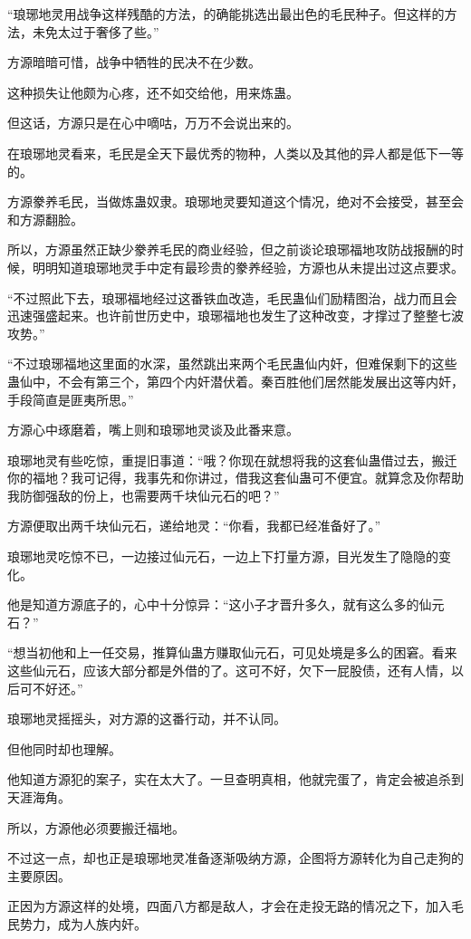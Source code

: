 \begin{this_body}
“琅琊地灵用战争这样残酷的方法，的确能挑选出最出色的毛民种子。但这样的方法，未免太过于奢侈了些。”

方源暗暗可惜，战争中牺牲的民决不在少数。

这种损失让他颇为心疼，还不如交给他，用来炼蛊。

但这话，方源只是在心中嘀咕，万万不会说出来的。

在琅琊地灵看来，毛民是全天下最优秀的物种，人类以及其他的异人都是低下一等的。

方源豢养毛民，当做炼蛊奴隶。琅琊地灵要知道这个情况，绝对不会接受，甚至会和方源翻脸。

所以，方源虽然正缺少豢养毛民的商业经验，但之前谈论琅琊福地攻防战报酬的时候，明明知道琅琊地灵手中定有最珍贵的豢养经验，方源也从未提出过这点要求。

“不过照此下去，琅琊福地经过这番铁血改造，毛民蛊仙们励精图治，战力而且会迅速强盛起来。也许前世历史中，琅琊福地也发生了这种改变，才撑过了整整七波攻势。”

“不过琅琊福地这里面的水深，虽然跳出来两个毛民蛊仙内奸，但难保剩下的这些蛊仙中，不会有第三个，第四个内奸潜伏着。秦百胜他们居然能发展出这等内奸，手段简直是匪夷所思。”

方源心中琢磨着，嘴上则和琅琊地灵谈及此番来意。

琅琊地灵有些吃惊，重提旧事道：“哦？你现在就想将我的这套仙蛊借过去，搬迁你的福地？我可记得，我事先和你讲过，借我这套仙蛊可不便宜。就算念及你帮助我防御强敌的份上，也需要两千块仙元石的吧？”

方源便取出两千块仙元石，递给地灵：“你看，我都已经准备好了。”

琅琊地灵吃惊不已，一边接过仙元石，一边上下打量方源，目光发生了隐隐的变化。

他是知道方源底子的，心中十分惊异：“这小子才晋升多久，就有这么多的仙元石？”

“想当初他和上一任交易，推算仙蛊方赚取仙元石，可见处境是多么的困窘。看来这些仙元石，应该大部分都是外借的了。这可不好，欠下一屁股债，还有人情，以后可不好还。”

琅琊地灵摇摇头，对方源的这番行动，并不认同。

但他同时却也理解。

他知道方源犯的案子，实在太大了。一旦查明真相，他就完蛋了，肯定会被追杀到天涯海角。

所以，方源他必须要搬迁福地。

不过这一点，却也正是琅琊地灵准备逐渐吸纳方源，企图将方源转化为自己走狗的主要原因。

正因为方源这样的处境，四面八方都是敌人，才会在走投无路的情况之下，加入毛民势力，成为人族内奸。


\end{this_body}
